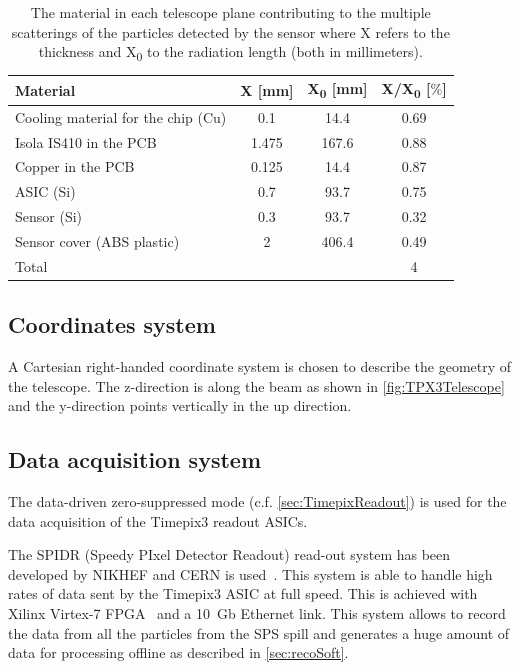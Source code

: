\begin{table}[htbp]
  \centering
  \caption{The material in each telescope plane contributing to the
    multiple scatterings of the particles detected by the sensor where
    X refers to the thickness and X\textsubscript{0} to the radiation
    length (both in millimeters).}
  \label{tab:TPX3TelescopeMaterial}
  \begin{tabular}{l c c c}
    \toprule
    Material & X [mm] & X\textsubscript{0} [mm] & X/X\textsubscript{0} [$\%$] \\
    \midrule
    Cooling material for the chip (Cu) & 0.1 & 14.4 & 0.69 \\
    Isola IS410 in the PCB & 1.475 & 167.6 & 0.88 \\
    Copper in the PCB & 0.125 & 14.4 & 0.87 \\
    ASIC (Si) & 0.7 & 93.7 & 0.75\\
    Sensor (Si) & 0.3 & 93.7 & 0.32\\ 
    Sensor cover (ABS plastic) & 2 & 406.4 & 0.49 \\ \hline
    Total & & & 4 \\
    \bottomrule
  \end{tabular}
\end{table}

\subsection{Coordinates system}
A Cartesian right-handed coordinate system is chosen to describe the
geometry of the telescope. The z-direction is along the beam as shown
in \cref{fig:TPX3Telescope} and the y-direction points vertically in
the up direction.

\subsection{Data acquisition system}
The data-driven zero-suppressed mode (c.f. \cref{sec:TimepixReadout})
is used for the data acquisition of the Timepix3 readout ASICs. 

The SPIDR (Speedy PIxel Detector Readout) read-out system has been
developed by NIKHEF and CERN is used~\cite{Visser:2015bsa}. This
system is able to handle high rates of data sent by the Timepix3 ASIC
at full speed. This is achieved with Xilinx Virtex-7
FPGA~\cite{XilinxVirtex7} and a 10~Gb Ethernet link. This system
allows to record the data from all the particles from the SPS spill
and generates a huge amount of data for processing offline as
described in \cref{sec:recoSoft}.


